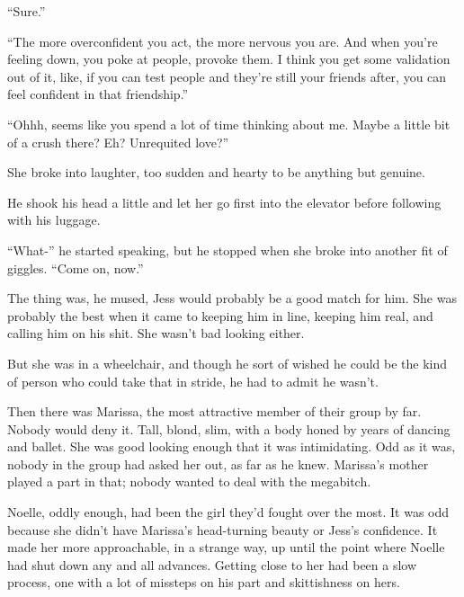 ``Sure.''



``The more overconfident you act, the more nervous you are.  And when you're feeling down, you poke at people, provoke them.  I think you get some validation out of it, like, if you can test people and they're still your friends after, you can feel confident in that friendship.''



``Ohhh, seems like you spend a lot of time thinking about me.  Maybe a little bit of a crush there?  Eh?  Unrequited love?''



She broke into laughter, too sudden and hearty to be anything but genuine.



He shook his head a little and let her go first into the elevator before following with his luggage.



``What-'' he started speaking, but he stopped when she broke into another fit of giggles.  ``Come on, now.''



The thing was, he mused, Jess would probably be a good match for him.  She was probably the best when it came to keeping him in line, keeping him real, and calling him on his shit.  She wasn't bad looking either.



But she was in a wheelchair, and though he sort of wished he could be the kind of person who could take that in stride, he had to admit he wasn't.



Then there was Marissa, the most attractive member of their group by far.  Nobody would deny it.  Tall, blond, slim, with a body honed by years of dancing and ballet.  She was good looking enough that it was intimidating.  Odd as it was, nobody in the group had asked her out, as far as he knew.  Marissa's mother played a part in that; nobody wanted to deal with the megabitch.



Noelle, oddly enough, had been the girl they'd fought over the most.  It was odd because she didn't have Marissa's head-turning beauty or Jess's confidence.  It made her more approachable, in a strange way, up until the point where Noelle had shut down any and all advances.  Getting close to her had been a slow process, one with a lot of missteps on his part and skittishness on hers.



